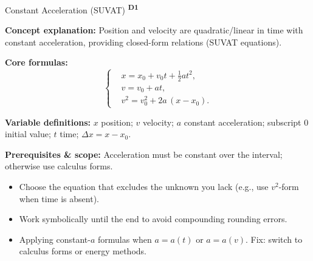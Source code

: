 ﻿\documentclass[12pt,a4paper]{article}
\providecommand{\KPFormulas}{}
\providecommand{\KPHeuristics}{}
\newcommand{\DOne}{\texorpdfstring{\textsuperscript{\textbf{D1}}}{ D1}}
\begin{document}
\begin{KnowledgePoint}{Constant Acceleration (SUVAT) \DOne}
  \KPFormulas
  \begin{formulabox}
  \textbf{Concept explanation:} Position and velocity are quadratic/linear in time with constant acceleration, providing closed-form relations (SUVAT equations).

  \textbf{Core formulas:}
  \[
  \left\{\begin{aligned}
    &x=x_0+v_0 t+\tfrac12 a t^2,\\
    &v=v_0+at,\\
    &v^2=v_0^2+2a\,(x-x_0).
  \end{aligned}\right.
  \]

  \textbf{Variable definitions:} $x$ position; $v$ velocity; $a$ constant acceleration; subscript $0$ initial value; $t$ time; $\Delta x=x-x_0$.


  \textbf{Prerequisites \& scope:} Acceleration must be constant over the interval; otherwise use calculus forms.
  \end{formulabox}

  \KPHeuristics
  \begin{heuristicsbox}
  \begin{itemize}[leftmargin=*]
    \item Choose the equation that excludes the unknown you lack (e.g., use $v^2$-form when time is absent).
    \item Work symbolically until the end to avoid compounding rounding errors.
  \end{itemize}
  \vspace{0.4em}
  \begin{itemize}[leftmargin=*]
    \item Applying constant-$a$ formulas when $a=a(t)$ or $a=a(v)$. Fix: switch to calculus forms or energy methods.
  \end{itemize}
  \end{heuristicsbox}


\end{KnowledgePoint}
\end{document}
